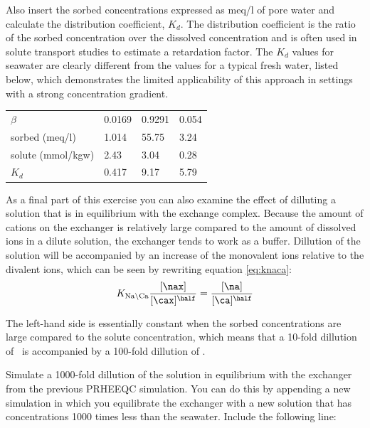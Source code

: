 Also insert the sorbed concentrations expressed as meq/l of pore water and calculate the distribution coefficient, $K_d$. The distribution coefficient is the ratio of the sorbed concentration over the dissolved concentration and is often used in solute transport studies to estimate a retardation factor. The $K_d$ values for seawater are clearly different from the values for a typical fresh water, listed below, which demonstrates the limited applicability of this approach in settings with a strong concentration gradient.

\begin{table}[hb]
\centering
\footnotesize
\begin{tabular}{llll}
\toprule
 & \na	& \ca & \mg \\
\midrule
$\beta$           & 0.0169 & 0.9291 & 0.054 \\
sorbed (meq/l)    & 1.014  & 55.75  & 3.24 \\
solute (mmol/kgw) & 2.43   & 3.04   & 0.28 \\
$K_d$             & 0.417  & 9.17   & 5.79 \\
\bottomrule
\end{tabular}
\end{table}

As a final part of this exercise you can also examine the effect of dilluting a solution that is in equilibrium with the exchange complex. Because the amount of cations on the exchanger is relatively large compared to the amount of dissolved ions in a dilute solution, the exchanger tends to work as a buffer. Dillution of the solution will be accompanied by an increase of the monovalent ions relative to the divalent ions, which can be seen by rewriting equation \ref{eq:knaca}:
\begin{equation}
K_{\text{Na} \backslash \text{Ca}} \frac{[\nax]}{[\cax]^{\half}} = \frac{[\na]}{[\ca]^{\half}}
\end{equation}

The left-hand side is essentially constant when the sorbed concentrations are large compared to the solute concentration, which means that a 10-fold dillution of \na\ is accompanied by a 100-fold dillution of \ca.

Simulate a 1000-fold dillution of the solution in equilibrium with the exchanger from the previous PRHEEQC simulation. You can do this by appending a new simulation in which you equilibrate the exchanger with a new solution that has concentrations 1000 times less than the seawater. Include the following line:

